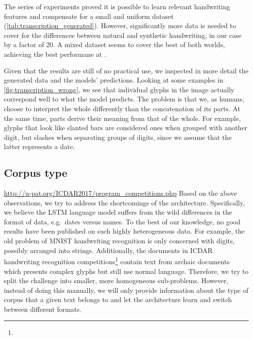 			The series of experiments proved it is possible to learn relevant handwriting features and compensate for a small and uniform dataset (\autoref{tab:transcription_generated}).  However, significantly more data is needed to cover for the differences between natural and synthetic handwriting, in our case by a factor of 20. A mixed dataset seems to cover the best of both worlds, achieving the best performane at .

			Given that the results are still of no practical use, we inspected in more detail the generated data and the models' predictions. Looking at some examples in \autoref{fig:transcription_wrong}, we see that individual glyphs in the image actually correspond well to what the model predicts. The problem is that we, as humans, choose to interpret the whole differently than the concatenation of its parts. At the same time, parts derive their meaning from that of the whole. For example, glyphs that look like slanted bars are considered ones when grouped with another digit, but slashes when separating groups of digits, since we assume that the latter represents a date.


	\subsection{Corpus type}

			\urldef{\ICDAR}\url{http://u-pat.org/ICDAR2017/program_competitions.php}
			Based on the above observations, we try to address the shortcomings of the architecture. Specifically, we believe the LSTM language model suffers from the wild differences in the format of data, e.g.\ dates versus names. To the best of our knowledge, no good results have been published on such highly heterogeneous data. For example, the old problem of MNIST handwriting recognition is only concerned with digits, possibly arranged into strings. Additionally, the documents in ICDAR handwriting recognition competitions\footnote{\ICDAR} contain text from archaic documents which presents complex glyphs but still use normal language. Therefore, we try to split the challenge into smaller, more homogeneous sub-problems. However, instead of doing this manually, we will only provide information about the type of corpus that a given text belongs to and let the architecture learn and switch between different formats.

